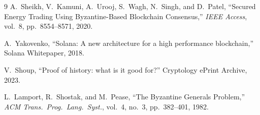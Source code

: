 \documentclass[conference]{IEEEtran}
\begin{document}
 \begin{thebibliography}{9}
 A.~Sheikh, V.~Kamuni, A.~Urooj, S.~Wagh, N.~Singh, and D.~Patel,
 ``Secured Energy Trading Using Byzantine-Based Blockchain Consensus,''
 \emph{IEEE Access}, vol.~8, pp.~8554--8571, 2020.
 
 A.~Yakovenko,
 ``Solana: A new architecture for a high performance blockchain,''
 Solana Whitepaper, 2018.
 
 V.~Shoup,
 ``Proof of history: what is it good for?''
 Cryptology ePrint Archive, 2023.
 
 L.~Lamport, R.~Shostak, and M.~Pease,
 ``The Byzantine Generals Problem,''
 \emph{ACM Trans.\ Prog.\ Lang.\ Syst.}, vol.~4, no.~3, pp.~382--401, 1982.
 \end{thebibliography}
 
 
\end{document}
